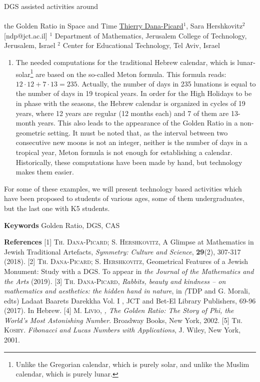 \begin{abstract_online}{DGS assisted activities around \\ \quad \\ the Golden Ratio in Space and Time}{%
        \underline{Thierry Dana-Picard}$^{1}$, Sara Hershkovitz$^{2}$}{[ndp@jct.ac.il]
        }{%
        $^1$ Department of Mathematics, Jerusalem College of Technology, Jerusalem, Israel \newline{}$^2$ Center for Educational Technology, Tel Aviv, Israel \newline{}}
\begin{enumerate}
\item The needed computations for the traditional Hebrew calendar, which is lunar-solar\footnote{Unlike the Gregorian calendar, which is purely solar, and unlike the Muslim calendar, which is purely lunar.} are based on the so-called Meton formula. This formula reads: $12 \cdot 12 + 7 \cdot 13 =235$. Actually, the number of days in 235 lunations is equal to the number of days in 19 tropical years. In order for the High Holidays to be in phase with the seasons, the Hebrew calendar is organized in cycles of 19 years, where 12 years are regular (12 months each) and 7 of them are 13-month years. This also leads to the appearance of the Golden Ratio in a non-geometric setting. It must be noted that, as the interval between two consecutive new moons is not an integer, neither is the number of days in a tropical year, Meton formula is not enough for establishing a calendar. Historically, these computations have been made by hand, but technology makes them easier.
\end{enumerate}
For some of these examples, we will present technology based activities which have been proposed to students of various ages, some of them undergraduates, but the last one with K5 students.


\textbf{Keywords} \newline{} Golden Ratio, DGS, CAS

\textbf{References} \newline{}
[1] \textsc{Th. Dana-Picard; S. Hershkovitz}, A Glimpse at Mathematics in Jewish Traditional Artefacts, \emph{Symmetry: Culture and Science}, \textbf{29}(2), 307-317 (2018).\newline{}
[2] \textsc{Th. Dana-Picard; S. Hershkovitz}, Geometrical Features of a Jewish Monument: Study with a DGS. To appear in \emph{the Journal of the Mathematics and the Arts} (2019). \newline{}
[3] \textsc{Th. Dana-Picard}, \emph{Rabbits, beauty and kindness – on mathematics and aesthetics: the hidden hand in nature}, in \emph(TDP and G. Morali, edts) Ladaat Baarets Darekkha Vol. I , JCT and Bet-El Library Publishers, 69-96 (2017). In Hebrew.\newline{}
[4] \textsc{M. Livio}, \emph{, The Golden Ratio: The Story of Phi, the World’s Most Astonishing Number}. Broadway Books, New York, 2002. \newline{}
[5] \textsc{Th. Koshy}. \emph{Fibonacci and Lucas Numbers with Applications}, J. Wiley, New York, 2001.
\end{abstract_online}





